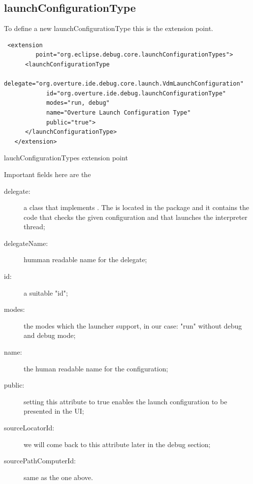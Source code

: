 \subsection{launchConfigurationType}
To define a new launchConfigurationType this is the extension point.
\begin{program}
\scriptsize
\begin{verbatim}
 <extension
         point="org.eclipse.debug.core.launchConfigurationTypes">
      <launchConfigurationType
            delegate="org.overture.ide.debug.core.launch.VdmLaunchConfiguration"
            id="org.overture.ide.debug.launchConfigurationType"
            modes="run, debug"
            name="Overture Launch Configuration Type"
            public="true">
      </launchConfigurationType>
   </extension>
\end{verbatim}
\caption{lauchConfigurationTypes extension point}
\normalsize
\end{program}

Important fields here are the
\begin{description}


\item[delegate:] a class that implements . The  is located in the package  and it contains the code that checks the given configuration and that launches the interpreter thread;

\item[delegateName:] humman readable name for the delegate;

\item[id:] a suitable "id";

\item[modes:] the modes which the launcher support, in our case: "run" without debug and debug mode;

\item[name:] the human readable name for the configuration;

\item[public:] setting this attribute to true enables the launch configuration to be presented in the UI;

\item[sourceLocatorId:] we will come back to this attribute later in the debug section;

\item[sourcePathComputerId:] same as the one above.
\end{description}

